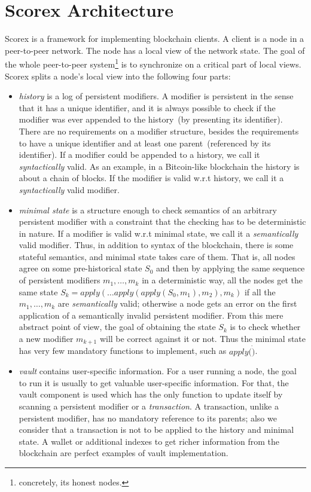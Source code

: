 
\section{Scorex Architecture}
\label{sec:scorex}

Scorex is a framework for implementing blockchain clients. A client is a node in a peer-to-peer network. The node has a local view of the network state. The goal of the whole peer-to-peer system\footnote{concretely, its honest nodes.} is to synchronize on a critical part of local views. Scorex splits a node's local view into the following four parts: 

\begin{itemize}
\item{\em history} is a log of persistent modifiers. A modifier is persistent in the sense that it has a unique identifier, and it is always possible to check if the modifier was ever appended to the history~(by presenting its identifier). There are no requirements on a modifier structure, besides the requirements to have a unique identifier and at least one parent~(referenced by its identifier). If a modifier could be appended to a history, we call it {\em syntactically} valid. As an example, in a Bitcoin-like blockchain the history is about a chain of blocks. 
If the modifier is valid w.r.t history, we call it a {\em syntactically} valid modifier.  
\item{\em minimal state} is a structure enough to check semantics of an arbitrary persistent modifier with a constraint that the checking has to be deterministic in nature. If a modifier is valid w.r.t minimal state, we call it a {\em semantically} valid modifier.
Thus, in addition to syntax of the blockchain, there is some stateful semantics, and minimal state takes care of them. That is, all nodes agree on some pre-historical state $S_0$ and then by applying the same sequence of persistent modifiers $m_1, \ldots, m_k$ in a deterministic way, all the nodes get the same state $S_k = apply(\ldots apply(apply(S_0, m_1), m_2), m_k)$ if all the $m_1, \ldots, m_k$ are {\em semantically} valid; otherwise a node gets an error on the first application of a semantically invalid persistent modifier. From this mere abstract point of view, the goal of obtaining the state $S_k$ is to check whether a new modifier $m_{k+1}$ will be correct against it or not. Thus the minimal state has very few mandatory functions to implement, such as $apply(\dot)$.
\item{\em vault} contains user-specific information. For a user running a node, the goal to run it is usually to get valuable user-specific information. For that, the vault component is used which has the only function to update itself by scanning a persistent modifier or a {\em transaction}. A transaction, unlike a persistent modifier, has no mandatory reference to its parents; also we consider that a transaction is not to be applied to the history and minimal state. A wallet or additional indexes to get richer information from the blockchain are perfect examples of vault implementation. 

\end{itemize}

